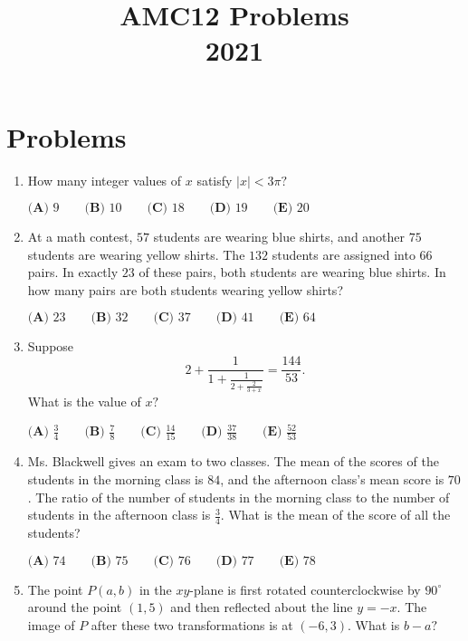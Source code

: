 \documentclass{article}
\title{AMC12 Problems \\ 2021}
\date{}
\begin{document}
\maketitle\thispagestyle{fancy}\newpage\section*{Problems}\begin{enumerate}[label=\arabic*., itemsep=0.5em]\item How many integer values of $x$ satisfy $|x|<3\pi?$

$\textbf{(A) }9 \qquad \textbf{(B) }10 \qquad \textbf{(C) }18 \qquad \textbf{(D) }19 \qquad \textbf{(E) }20$\par \vspace{0.5em}\item At a math contest, $57$ students are wearing blue shirts, and another $75$ students are wearing yellow shirts. The $132$ students are assigned into $66$ pairs. In exactly $23$ of these pairs, both students are wearing blue shirts. In how many pairs are both students wearing yellow shirts?

$\textbf{(A) }23 \qquad \textbf{(B) }32 \qquad \textbf{(C) }37 \qquad \textbf{(D) }41 \qquad \textbf{(E) }64$\par \vspace{0.5em}\item Suppose
\begin{equation*}
2+\frac{1}{1+\frac{1}{2+\frac{2}{3+x}}}=\frac{144}{53}.
\end{equation*}
What is the value of $x?$

$\textbf{(A) }\frac34 \qquad \textbf{(B) }\frac78 \qquad \textbf{(C) }\frac{14}{15} \qquad \textbf{(D) }\frac{37}{38} \qquad \textbf{(E) }\frac{52}{53}$\par \vspace{0.5em}\item Ms. Blackwell gives an exam to two classes. The mean of the scores of the students in the morning class is $84$, and the afternoon class's mean score is $70$. The ratio of the number of students in the morning class to the number of students in the afternoon class is $\frac34$. What is the mean of the score of all the students?

$\textbf{(A) }74 \qquad \textbf{(B) }75 \qquad \textbf{(C) }76 \qquad \textbf{(D) }77 \qquad \textbf{(E) }78$\par \vspace{0.5em}\item The point $P(a,b)$ in the $xy$-plane is first rotated counterclockwise by $90^\circ$ around the point $(1,5)$ and then reflected about the line $y=-x$. The image of $P$ after these two transformations is at $(-6,3)$. What is $b-a?$


\end{enumerate}
\end{document}
